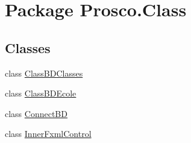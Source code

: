 \hypertarget{namespace_prosco_1_1_class}{\section{Package Prosco.\-Class}
\label{namespace_prosco_1_1_class}
}
\subsection*{Classes}
\begin{DoxyCompactItemize}
\item 
class \hyperlink{class_prosco_1_1_class_1_1_class_b_d_classes}{Class\-B\-D\-Classes}
\item 
class \hyperlink{class_prosco_1_1_class_1_1_class_b_d_ecole}{Class\-B\-D\-Ecole}
\item 
class \hyperlink{class_prosco_1_1_class_1_1_connect_b_d}{Connect\-B\-D}
\item 
class \hyperlink{class_prosco_1_1_class_1_1_inner_fxml_control}{Inner\-Fxml\-Control}
\end{DoxyCompactItemize}
